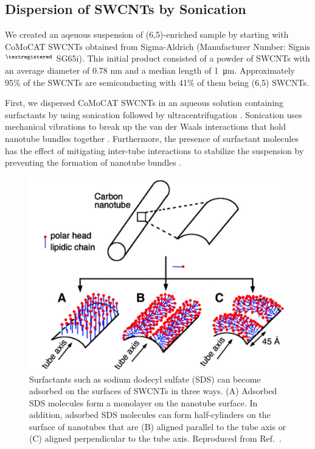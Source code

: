 \subsection{Dispersion of SWCNTs by Sonication}
\label{section:dispersion_swcnt}
We created an aqeuous suspension of (6,5)-enriched sample by starting with CoMoCAT SWCNTs obtained from Sigma-Aldrich (Manufacturer Number: Signis$^{\tiny{\textregistered}}$ SG65i). This initial product consisted of a powder of SWCNTs with an average diameter of 0.78 nm and a median length of \SI{1}{\micro \meter}. Approximately 95\% of the SWCNTs are semiconducting with 41\% of them being (6,5) SWCNTs.


First, we dispersed CoMoCAT SWCNTs in an aqueous solution containing surfactants by using sonication followed by ultracentrifugation \cite{liu1998fullerene, o2001reversible, o2002band, vaisman2006role}. Sonication uses mechanical vibrations to break up the van der Waals interactions that hold nanotube bundles together . Furthermore, the presence of surfactant molecules has the effect of mitigating inter-tube interactions to stabilize the suspension by preventing the formation of nanotube bundles \cite{liu1998fullerene, o2001reversible, o2002band}.

\begin{figure}[H]
\centering
\includegraphics[scale=0.3]{images/chapter_methods/surfactant_tkalya}
\caption{Surfactants such as sodium dodecyl sulfate (SDS) can become adsorbed on the surfaces of SWCNTs in three ways. (A) Adsorbed SDS molecules form a monolayer on the nanotube surface. In addition, adsorbed SDS molecules can form half-cylinders on the surface of nanotubes that are (B) aligned parallel to the tube axis or (C) aligned perpendicular to the tube axis. Reproduced from Ref.\ \cite{richard2003supramolecular}. }
\label{fig:sds_molecule}
\end{figure}

